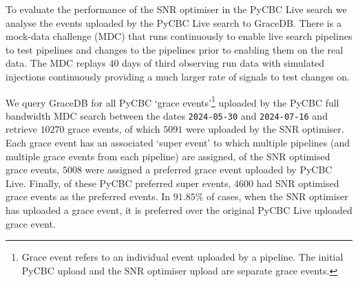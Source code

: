 To evaluate the performance of the SNR optimiser in the PyCBC Live search we analyse the events uploaded by the PyCBC Live search to GraceDB. There is a \gwadj mock-data challenge (MDC) that runs continuously to enable live search pipelines to test pipelines and changes to the pipelines prior to enabling them on the real \gwadj data. The MDC replays $40$ days of third observing run \gwadj data with simulated injections continuously providing a much larger rate of signals to test changes on.

We query GraceDB for all PyCBC `grace events'\footnote{Grace event refers to an individual event uploaded by a pipeline. The initial PyCBC upload and the SNR optimiser upload are separate grace events.} uploaded by the PyCBC full bandwidth MDC search between the dates \texttt{2024-05-30} and \texttt{2024-07-16} and retrieve $10270$ grace events, of which $5091$ were uploaded by the SNR optimiser. Each grace event has an associated `super event' to which multiple pipelines (and multiple grace events from each pipeline) are assigned, of the SNR optimised grace events, $5008$ were assigned a preferred grace event uploaded by PyCBC Live. Finally, of these PyCBC preferred super events, $4600$ had SNR optimised grace events as the preferred events. In $91.85\%$ of cases, when the SNR optimiser has uploaded a grace event, it is preferred over the original PyCBC Live uploaded grace event.

